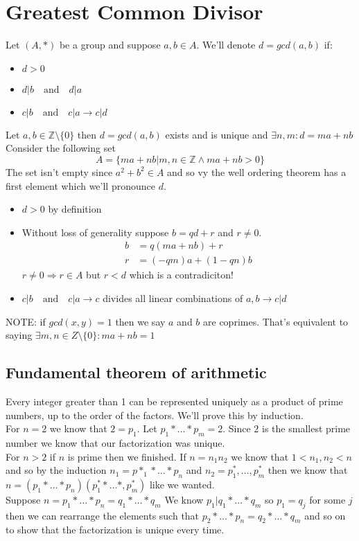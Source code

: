 \documentclass{article}
\newcommand{\Z}{\mathbb{Z}}
\begin{document}
	\newpage
	\section{Greatest Common Divisor}
	Let $(A,*)$ be a group and suppose $a,b\in A$. We'll denote $d = gcd(a,b)$ if:
	\begin{itemize}
		\item $d>0$
		\item $d|b \quad\mathrm{and}\quad d|a$
		\item $c|b \quad\mathrm{and}\quad c|a \rightarrow c|d$
	\end{itemize}
	Let $a,b\in \Z\setminus\{0\}$ then $d = gcd(a,b)$ exists and is unique and $\exists n,m:d=ma+nb$
	Consider the following set
	\[
		A = \{ma+nb|m,n\in\Z \land ma+nb>0\}
	\]
	The set isn't empty since $a^2+b^2\in A$ and so vy the well ordering theorem has a first element which we'll pronounce $d$.
	\begin{itemize}
		\item $d>0$ by definition
		\item Without loss of generality suppose $b=qd+r$ and $r\ne 0$.
		\begin{align*}
			b &= q(ma+nb)+r \\
			r &= (-qm)a + (1-qn)b
		\end{align*}
		$r\ne 0 \Rightarrow r\in A$ but $r<d$ which is a contradiciton! 
		\item $c|b \quad\mathrm{and}\quad c|a \rightarrow c$ divides all linear combinations of $a,b\rightarrow c|d$
	\end{itemize}
	NOTE: if $gcd(x,y) = 1$ then we say $a$ and $b$ are coprimes. That's equivalent to saying $\exists m,n\in Z\setminus\{0\}:ma+nb =  1$
	\subsection{Fundamental theorem of arithmetic}
	Every integer greater than 1 can be represented uniquely as a product of prime numbers, up to the order of the factors. We'll prove this by induction.\\
	For $n = 2$ we know that $2=p_1$. Let $p_1*\ldots*p_m=2$. Since $2$ is the smallest prime number we know that our factorization was unique.\\
	For $n > 2$ if $n$ is prime then we finished. If $n=n_1n_2$ we know that $1<n_1,n_2<n$ and so by the induction $n_1=p*_1*\ldots *p_n$ and $n_2=p^*_1,\ldots,p^*_m$ then we know that $n=(p_1*\ldots *p_n)(p^*_1*\ldots *,p^*_m)$ like we wanted.\\
	Suppose $n=p_1*\ldots *p_n=q_1*\ldots *q_m$ We know $p_1|q_1*\ldots *q_m$ so $p_1=q_j$ for some $j$ then we can rearrange the elements such that $p_2*\ldots *p_n = q_2*\ldots *q_m$ and so on to show that the factorization is unique every time.
\end{document}
